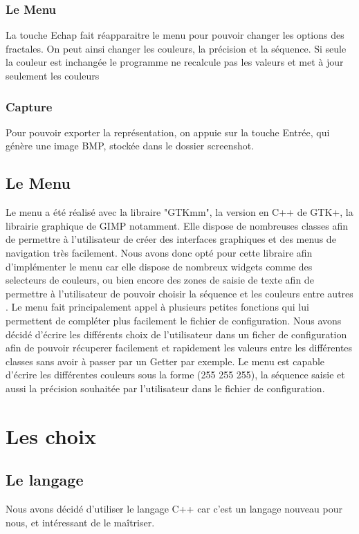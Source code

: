 \documentclass{article}
\begin{document}
    \subsubsection{Le Menu}

    La touche Echap fait réapparaitre le menu pour pouvoir changer les options des fractales.
    On peut ainsi changer les couleurs, la précision et la séquence.
    Si seule la couleur est inchangée le programme ne recalcule pas les valeurs et met à jour seulement les couleurs

    \subsubsection{Capture}

    Pour pouvoir exporter la représentation, on appuie sur la touche Entrée, qui génère une image BMP, stockée dans le dossier screenshot.

    \subsection{Le Menu}
	Le menu a été réalisé avec la libraire "GTKmm", la version en C++ de GTK+, la librairie graphique de GIMP notamment.
	Elle dispose de nombreuses classes afin de permettre à l'utilisateur de créer des interfaces graphiques et des menus de navigation très facilement.
	Nous avons donc opté pour cette libraire afin d'implémenter le menu car elle dispose de nombreux widgets comme des selecteurs de couleurs, ou bien encore des zones de saisie de texte afin de permettre à l'utilisateur de pouvoir choisir la séquence et les couleurs entre autres .
	Le menu fait principalement appel à plusieurs petites fonctions qui lui permettent de compléter plus facilement le fichier de configuration.
	Nous avons décidé d'écrire les différents choix de l'utilisateur dans un ficher de configuration afin de pouvoir récuperer facilement et rapidement les valeurs entre les différentes classes sans avoir à passer par un Getter par exemple.
    Le menu est capable d'écrire les différentes couleurs sous la forme (255 255 255), la séquence saisie et aussi la précision souhaitée par l'utilisateur dans le fichier de configuration.

	\section{Les choix}

    \subsection{Le langage}
    Nous avons décidé d'utiliser le langage C++ car c'est un langage nouveau pour nous, et intéressant de le maîtriser.
\end{document}
